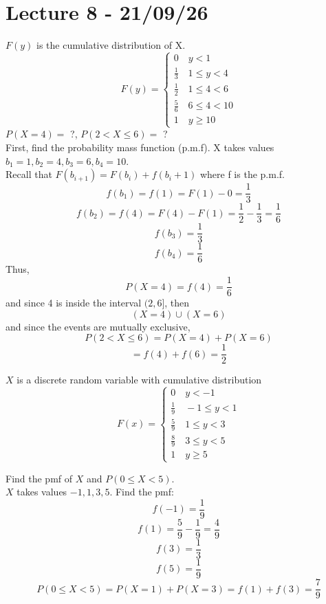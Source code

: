 \documentclass[11pt]{article}
\begin{document}
\section{Lecture 8 - 21/09/26}
\begin{example}
$F(y)$ is the cumulative distribution of X.
\[
    F(y) = 
    \begin{cases}
        0 \quad y < 1\\
        \frac{1}{3} \quad 1 \le y < 4\\
        \frac{1}{2} \quad 1 \le 4 < 6 \\
        \frac{5}{6} \quad 6 \le 4 < 10 \\
        1 \quad y \ge 10 
    \end{cases}
\]
$P(X = 4) =$ ?, $P(2 < X \le 6) = $ ?\\
First, find the probability mass function (p.m.f). X takes values $b_1 = 1, b_2 = 4, b_3 = 6, b_4 = 10$.\\
Recall that $F(b_{i + 1}) = F(b_i) + f(b_i+1)$ where f is the p.m.f.\\
\[
    f(b_1) = f(1) = F(1) - 0 = \frac{1}{3}
\] 
\[
    f(b_2) = f(4) = F(4) - F(1) = \frac{1}{2}- \frac{1}{3} = \frac{1}{6}
\]
\[
    f(b_3) = \frac{1}{3}
\]
\[
    f(b_4) = \frac{1}{6}
\]
Thus,
\[
    P(X=4) = f(4) = \frac{1}{6}
\]
and since 4 is inside the interval $(2, 6]$, then 
\[
    (X=4) \cup (X=6)
\]
and since the events are mutually exclusive,
\[
    P(2 < X \le 6) = P(X = 4) + P(X=6)
\]
\[
    = f(4) + f(6) = \frac{1}{2}
\]
\end{example}
\begin{example}
$X$ is a discrete random variable with cumulative distribution
\[
    F(x) =
    \begin{cases}
        0 \quad y < -1\\
        \frac{1}{9} \quad -1 \le y < 1\\
        \frac{5}{9} \quad 1 \le y < 3 \\
        \frac{8}{9} \quad 3 \le y < 5\\
        1 \quad y \ge 5
    \end{cases}
\]

Find the pmf of $X$ and $P(0 \le X < 5)$.\\
$X$ takes values $-1, 1, 3, 5$. Find the pmf:
\[
    f(-1) = \frac{1}{9}
\]
\[
    f(1) = \frac{5}{9} - \frac{1}{9} = \frac{4}{9}
\]
\[
    f(3) = \frac{1}{3}
\]
\[
    f(5) = \frac{1}{9}
\]
\[
    P(0 \le X < 5) = P(X=1) + P(X=3) = f(1) + f(3) = \frac{7}{9}
\]
\end{example}
\end{document}
